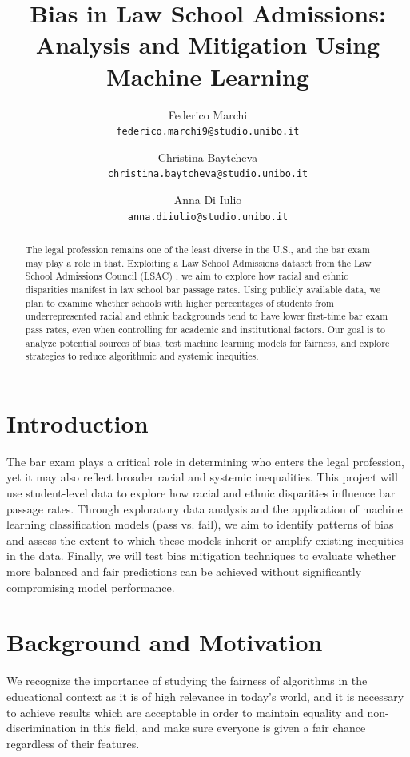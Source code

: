 \documentclass{article}
\title{Bias in Law School Admissions: Analysis and Mitigation Using Machine Learning}
\author{
  Federico Marchi\\
  \texttt{federico.marchi9@studio.unibo.it}
  \and
  Christina Baytcheva\\
  \texttt{christina.baytcheva@studio.unibo.it}
  \and
  Anna Di Iulio\\
  \texttt{anna.diiulio@studio.unibo.it}
}
\begin{document}
\maketitle

\begin{abstract}
The legal profession remains one of the least diverse in the U.S., and the bar exam may play a role in that. Exploiting a Law School Admissions dataset from the Law School Admissions Council (LSAC) , we aim to explore how racial and ethnic disparities manifest in law school bar passage rates. Using publicly available data, we plan to examine whether schools with higher percentages of students from underrepresented racial and ethnic backgrounds tend to have lower first-time bar exam pass rates, even when controlling for academic and institutional factors. Our goal is to analyze potential sources of bias, test machine learning models for fairness, and explore strategies to reduce algorithmic and systemic inequities.

\end{abstract}

\section{Introduction}

The bar exam plays a critical role in determining who enters the legal profession, yet it may also reflect broader racial and systemic inequalities. This project will use student-level data to explore how racial and ethnic disparities influence bar passage rates. Through exploratory data analysis and the application of machine learning classification models (pass vs. fail), we aim to identify patterns of bias and assess the extent to which these models inherit or amplify existing inequities in the data. Finally, we will test bias mitigation techniques to evaluate whether more balanced and fair predictions can be achieved without significantly compromising model performance.

\section{Background and Motivation}
We recognize the importance of studying the fairness of algorithms in the educational context as it is of high relevance in today’s world, and it is necessary to achieve results which are acceptable in order to maintain equality and non-discrimination in this field, and make sure everyone is given a fair chance regardless of their features.
\end{document}

